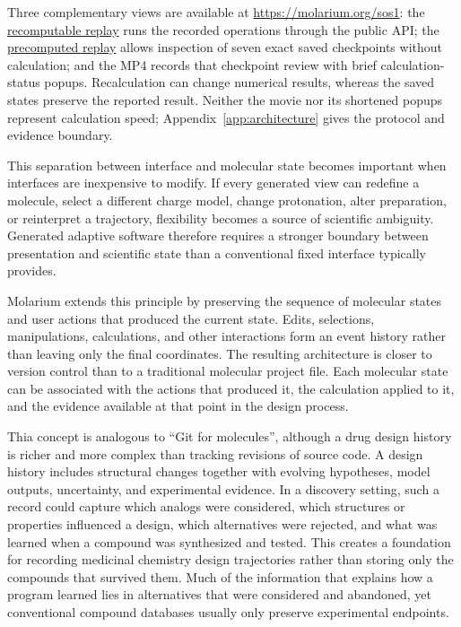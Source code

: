 \documentclass[11pt]{article}
\begin{document}
Three complementary views are available at \url{https://molarium.org/sos1}: the \href{https://molarium.org/sos1-hit-to-bay293}{recomputable replay} runs the recorded operations through the public API; the \href{https://molarium.org/sos1-hit-to-bay293/review}{precomputed replay} allows inspection of seven exact saved checkpoints without calculation; and the MP4 records that checkpoint review with brief calculation-status popups. Recalculation can change numerical results, whereas the saved states preserve the reported result. Neither the movie nor its shortened popups represent calculation speed; Appendix~\ref{app:architecture} gives the protocol and evidence boundary.

This separation between interface and molecular state becomes important when interfaces are inexpensive to modify. If every generated view can redefine a molecule, select a different charge model, change protonation, alter preparation, or reinterpret a trajectory, flexibility becomes a source of scientific ambiguity. Generated adaptive software therefore requires a stronger boundary between presentation and scientific state than a conventional fixed interface typically provides.

Molarium extends this principle by preserving the sequence of molecular states and user actions that produced the current state. Edits, selections, manipulations, calculations, and other interactions form an event history rather than leaving only the final coordinates. The resulting architecture is closer to version control than to a traditional molecular project file. Each molecular state can be associated with the actions that produced it, the calculation applied to it, and the evidence available at that point in the design process.

Thia concept is analogous to ``Git for molecules'', although a drug design history is richer and more complex than tracking revisions of source code. A design history includes structural changes together with evolving hypotheses, model outputs, uncertainty, and experimental evidence. In a discovery setting, such a record could capture which analogs were considered, which structures or properties influenced a design, which alternatives were rejected, and what was learned when a compound was synthesized and tested. This creates a foundation for recording medicinal chemistry design trajectories rather than storing only the compounds that survived them. Much of the information that explains how a program learned lies in alternatives that were considered and abandoned, yet conventional compound databases usually only preserve experimental endpoints.
\end{document}
